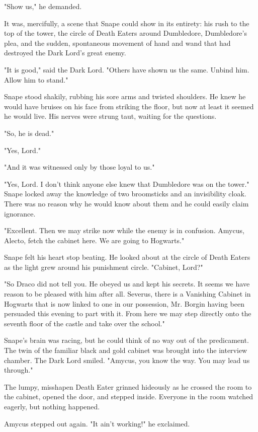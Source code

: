 \documentclass[a4paper,11pt]{article}
\begin{document}
"Show us," he demanded.

It was, mercifully, a scene that Snape could show in its entirety: his rush to the top of the tower, the circle of Death Eaters around Dumbledore, Dumbledore's plea, and the sudden, spontaneous movement of hand and wand that had destroyed the Dark Lord's great enemy.

"It is good," said the Dark Lord. "Others have shown us the same. Unbind him. Allow him to stand."

Snape stood shakily, rubbing his sore arms and twisted shoulders. He knew he would have bruises on his face from striking the floor, but now at least it seemed he would live. His nerves were strung taut, waiting for the questions.

"So, he is dead."

"Yes, Lord."

"And it was witnessed only by those loyal to us."

"Yes, Lord. I don't think anyone else knew that Dumbledore was on the tower." Snape locked away the knowledge of two broomsticks and an invisibility cloak. There was no reason why he would know about them and he could easily claim ignorance.

"Excellent. Then we may strike now while the enemy is in confusion. Amycus, Alecto, fetch the cabinet here. We are going to Hogwarts."

Snape felt his heart stop beating. He looked about at the circle of Death Eaters as the light grew around his punishment circle. "Cabinet, Lord?"

"So Draco did not tell you. He obeyed us and kept his secrets. It seems we have reason to be pleased with him after all. Severus, there is a Vanishing Cabinet in Hogwarts that is now linked to one in our possession, Mr. Borgin having been persuaded this evening to part with it. From here we may step directly onto the seventh floor of the castle and take over the school."

Snape's brain was racing, but he could think of no way out of the predicament. The twin of the familiar black and gold cabinet was brought into the interview chamber. The Dark Lord smiled. "Amycus, you know the way. You may lead us through."

The lumpy, misshapen Death Eater grinned hideously as he crossed the room to the cabinet, opened the door, and stepped inside. Everyone in the room watched eagerly, but nothing happened.

Amycus stepped out again. "It ain't working!" he exclaimed.
\end{document}
